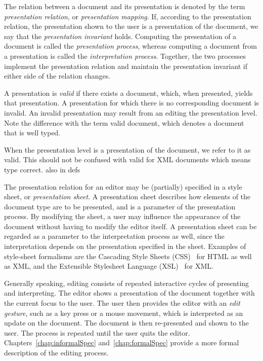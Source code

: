 The relation between a document and its presentation is denoted by the term {\em presentation relation}, or {\em presentation mapping}. If, according to the presentation relation, the presentation shown to the user is a presentation of the document, we say that the {\em presentation invariant} holds. Computing the presentation of a document is called the {\em presentation process}, whereas computing a document from a presentation is called the {\em interpretation process}. Together, the two processes implement the presentation relation and maintain the presentation invariant if either side of the relation changes.

A presentation is {\em valid} if there exists a document, which, when presented, yields that presentation. A presentation for which there is no corresponding document is invalid. An invalid presentation may result from an editing the presentation level. Note the difference with the term valid document, which denotes a document that is well typed.

\bc
When the presentation level is a presentation of the document, we refer to it as valid. This should not be confused with valid for XML documents which means type correct.
also in defs
\ec

The presentation relation for an editor may be (partially) specified in a style sheet, or {\em presentation sheet}. A presentation sheet describes how elements of the document type are to be presented, and is a parameter of the presentation process. By modifying the sheet, a user may influence the appearance of the document without having to modify the editor itself. A presentation sheet can be regarded as a parameter to the interpretation process as well, since the interpretation depends on the presentation specified in the sheet. Examples of style-sheet formalisms are the Cascading Style Sheets (CSS)~\cite{css2} for HTML as well as XML, and the Extensible Stylesheet Language (XSL)~\cite{xsl10} for XML.

Generally speaking, editing consists of repeated interactive cycles of presenting and interpreting. The editor shows a presentation of the document together with the current focus to the user. The user then provides the editor with an {\em edit gesture}, such as a key press or a mouse movement, which is interpreted as an update on the document. The document is then re-presented and shown to the user. The process is repeated until the user quits the editor. Chapters~\ref{chap:informalSpec} and~\ref{chap:formalSpec} provide a more formal description of the editing process.

